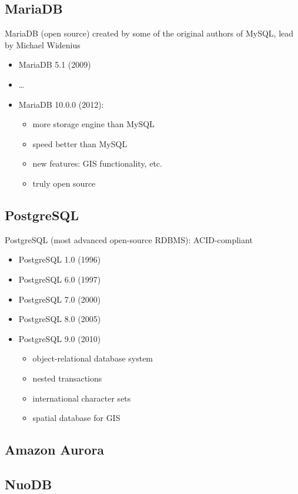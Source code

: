\subsection{MariaDB}

MariaDB (open source) created by some of the original authors of MySQL, lead by
Michael Widenius
\begin{itemize}
  \item MariaDB 5.1 (2009)
  \item \ldots
  \item MariaDB 10.0.0 (2012): 
  \begin{itemize}
    \item more storage engine than MySQL
    \item speed better than MySQL
    \item new features: GIS functionality, etc.
    \item truly open source
  \end{itemize}
\end{itemize}

\subsection{PostgreSQL}

PostgreSQL (most advanced open-source RDBMS): ACID-compliant
\begin{itemize}
  \item PostgreSQL 1.0 (1996)
  \item PostgreSQL 6.0 (1997)
  \item PostgreSQL 7.0 (2000)
  \item PostgreSQL 8.0 (2005)
  \item PostgreSQL 9.0 (2010)
  \begin{itemize}
    \item object-relational database system
    \item nested transactions
    \item international character sets
    \item spatial database for GIS
\end{itemize}
\end{itemize}

\subsection{Amazon Aurora}
\label{sec:Aurora}

\subsection{NuoDB}
\label{sec:NuoDB}


